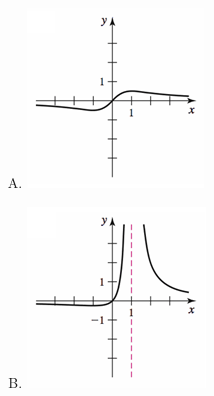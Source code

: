 \documentclass[12pt]{article}
\begin{document}
\begin{enumerate}
\begin{enumerate}[(A)]
	\item \includegraphics[scale=1.3]{exam1asec2p4A}\hspace{3pc}
	\vspace{3pc}
	
	\item \includegraphics[scale=1.3]{exam1asec2p4C}\hspace{3pc}
	\vspace{3pc}

\end{enumerate}
\end{enumerate}
\end{document}
